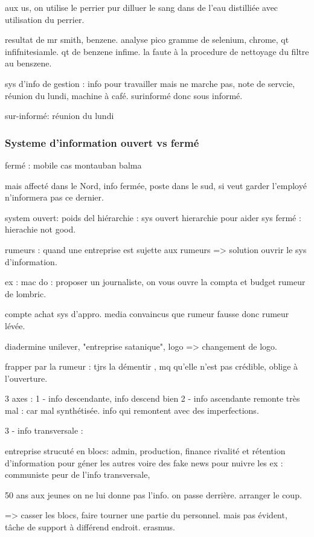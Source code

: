 \documentclass[a4paper,12pt]{article}
\begin{document}
aux us, on utilise le perrier pur dilluer le sang dans de l'eau distilliée avec utilisation du perrier.

resultat de mr smith, benzene. 
analyse pico gramme de selenium, chrome, qt infifnitesiamle.
qt de benzene infime.
la faute à la procedure de nettoyage du filtre au benszene.

sys d'info de gestion : info pour travailler mais ne marche pas,
note de servcie, réunion du lundi, machine à café. surinformé donc sous informé.

sur-informé: réunion du lundi

 \subsubsection{Systeme d'information ouvert vs fermé}
 
 fermé : mobile cas montauban balma
 
 mais affecté dans le Nord,
 info fermée, poste dans le sud, si veut garder l'employé n'informera pas ce dernier.
 
 system ouvert: poids del hiérarchie : sys ouvert hierarchie pour aider
 sys fermé : hierachie not good.
 
 rumeurs : quand une entreprise est sujette aux rumeurs => solution ouvrir le sys d'information.
 
 ex : mac do : proposer un journaliste, on vous ouvre la compta et budget rumeur de lombric.
 
 compte achat sys d'appro. media convaincus que rumeur fausse donc rumeur lévée.
 
 diadermine unilever, "entreprise satanique", logo  => changement de logo.
 
 frapper par la rumeur : tjrs la démentir , mq qu'elle n'est pas crédible, oblige à l'ouverture.
 
 
 
 3 axes : 
 1 - info descendante, info descend bien
 2 - info ascendante remonte très mal : car mal synthétisée.
 info qui remontent avec des imperfections.
 
 3 - info transversale :
 
entreprise strucuté en blocs: admin, production, finance
rivalité et rétention d'information pour géner les autres voire des fake news
pour nuivre les
ex : communiste peur de l'info transversale, 

50 ans aux jeunes on ne lui donne pas l'info.
on passe derrière. arranger le coup.

=> casser les blocs, faire tourner une partie du personnel. mais pas évident, tâche
de support à différend endroit. erasmus.
\end{document}
